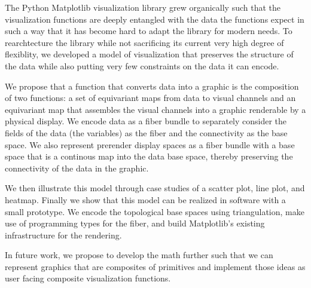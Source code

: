 The Python Matplotlib visualization library grew organically such that the visualization functions are deeply entangled with the data the functions expect in such a way that it has become hard to adapt the library for modern needs. To rearchtecture the library while not sacrificing its current very high degree of flexiblity, we developed a model of visualization that preserves the structure of the data while also putting very few constraints on the data it can encode. 

We propose that a function that converts data into a graphic is the composition of two functions: a set of equivariant maps from data to visual channels and an equivariant map that assembles the visual channels into a graphic renderable by a physical display. We encode data as a fiber bundle to separately consider the fields of the data (the variables) as the fiber and the connectivity as the base space. We also represent prerender display spaces as a fiber bundle with a base space that is a continous map into the data base space, thereby preserving the connectivity of the data in the graphic. 

We then illustrate this model through case studies of a scatter plot, line plot, and heatmap. Finally we show that this model can be realized in software with a small prototype. We encode the topological base spaces using triangulation, make use of programming types for the fiber, and build Matplotlib's existing infrastructure for the rendering.  

In future work, we propose to develop the math further such that we can represent graphics that are composites of primitives and implement those ideas as user facing composite visualization functions. 

